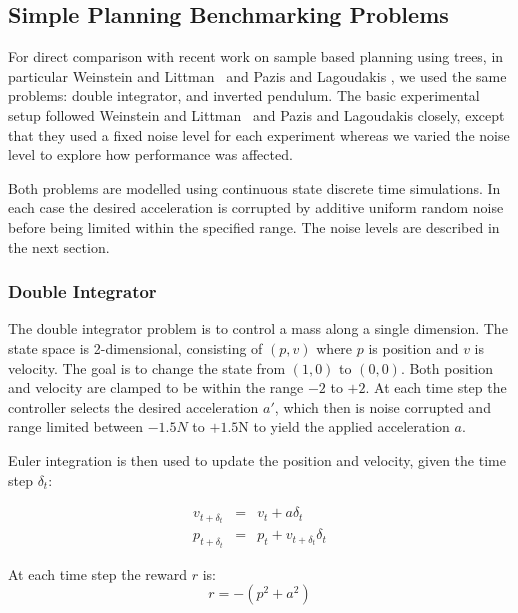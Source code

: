 \documentclass[conference]{IEEEtran}
\begin{document}
\subsection{Simple Planning Benchmarking Problems}





For direct comparison with recent work on sample based planning using trees, in particular
Weinstein and Littman~\cite{weinstein2012bandit} and Pazis and Lagoudakis \cite{PazisBAS},
we used the same problems: double integrator, and inverted pendulum.  The basic
experimental setup followed Weinstein and Littman~\cite{weinstein2012bandit}
and Pazis and Lagoudakis \cite{PazisBAS}
closely, except that they used a fixed noise level for each experiment whereas we varied the
noise level to explore how performance was affected.

Both problems are modelled
using continuous state discrete time simulations.  In each case the desired
acceleration is corrupted by additive uniform random noise
before being limited within the specified range.  The noise levels are described in the next section.


\subsubsection{Double Integrator}

The double integrator problem is to control a mass along a single dimension.  The state space
is 2-dimensional, consisting of $(p,v)$ where $p$ is position and $v$ is velocity.
The goal is to change the state from $(1,0)$ to $(0,0)$.  Both position and velocity
are clamped to be within the range $-2$ to $+2$.  At each time step the controller selects
the desired acceleration $a'$, which then is noise corrupted and range limited between $-1.5N$ to $+1.5$N to yield the
applied acceleration $a$.

Euler integration is then used to update the position and velocity, given the time step $\delta_t$:

\begin{eqnarray}
v_{t+\delta_t} & = & v_{t} + a \delta_t \\
p_{t+\delta_t} & = & p_{t} + v_{t+\delta_t} \delta_t
\end{eqnarray}

At each time step the reward $r$ is:
\begin{equation}
 r = -(p^2 + a^2)
\end{equation}
\end{document}
